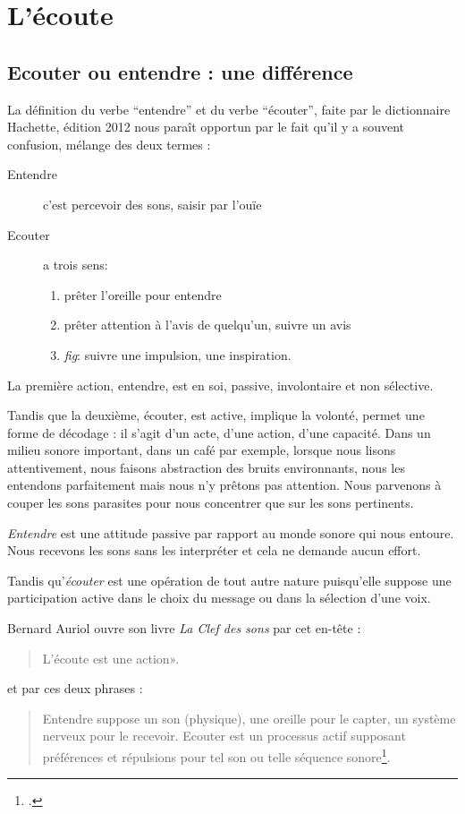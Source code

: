 \chapter{L'écoute}

\section{Ecouter ou entendre : une différence}

La définition du verbe ``entendre'' et du
verbe ``écouter'', faite par le dictionnaire Hachette, édition 2012 nous paraît opportun par le fait qu'il y a souvent confusion, mélange des deux termes : 
\begin{description}
\item[Entendre] c'est  percevoir des sons, saisir par l'ouïe
\item[Ecouter] a trois sens: 
\begin{enumerate}
	\item prêter l'oreille pour entendre
	\item prêter attention
	à l'avis de quelqu'un, suivre un avis
	\item \emph{fig}: suivre une impulsion,
	une inspiration.
\end{enumerate}
\end{description}

La première action, entendre,  est en soi, passive, involontaire et non sélective. 

Tandis que la deuxième, écouter, est active, implique la volonté, permet une forme de décodage : il s'agit d'un acte, d'une action, d'une capacité. Dans un milieu sonore important, dans un café par exemple, lorsque nous lisons attentivement, nous faisons abstraction des bruits
environnants, nous les entendons parfaitement mais nous n'y prêtons
pas attention. Nous parvenons à couper les sons parasites pour nous
concentrer que sur les sons pertinents.

\emph{Entendre} est une attitude passive par rapport au monde sonore
qui nous entoure. Nous recevons les sons sans les interpréter et cela
ne demande aucun effort.

Tandis qu'\emph{écouter} est une opération de tout autre nature puisqu'elle
suppose une participation active dans le choix du message ou dans
la sélection d'une voix.

Bernard Auriol ouvre son livre \emph{La Clef
des sons} par cet en-tête :
\begin{quote}
\og L'écoute est une action». %
\end{quote} %
et par ces deux phrases :
\begin{quotation} %
  Entendre suppose un son (physique), une oreille
pour le capter, un système nerveux pour le recevoir. Ecouter est un
processus actif supposant préférences et répulsions pour tel son ou
telle séquence sonore\footnote{\cite{Auri96:clesons}.}.
\end{quotation}
 
